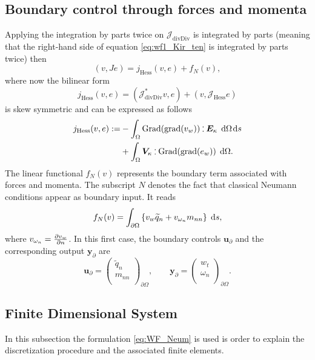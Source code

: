 \documentclass[letterpaper, 10 pt, conference]{ieeeconf}
\def\onedot{$\mathsurround0pt\ldotp$}
\def\cddot{%
	\mathbin{\vcenter{\baselineskip.67ex
			\hbox{\onedot}\hbox{\onedot}}%
}}
\begin{document}
\subsection{Boundary control through forces and momenta}
\label{subsec:controlForces}
Applying the integration by parts twice on $\mathcal{J}_{\mathrm{divDiv}}$ is integrated by parts (meaning that 
the right-hand side of equation \eqref{eq:wf1_Kir_ten} is integrated by parts twice) then 
\begin{equation}
\label{eq:WF_Neum}
(v, Je) = j_{\mathrm{Hess}}(v, e) + f_{N}(v),
\end{equation}
where now the bilinear form 
\[j_{\mathrm{Hess}}(v, e) = (\mathcal{J}_{\mathrm{divDiv}}^* v, e) + (v, \mathcal{J}_{\mathrm{Hess}}e) \] 
is skew symmetric and can be expressed as follows
\begin{equation} \label{eq:j_allgrad}
\begin{aligned}
j_{\mathrm{Hess}}(v, e): =  &-  \displaystyle\int_{\Omega} \mathrm{Grad}(\mathrm{grad}(v_w))  \cddot \bm{E}_{\kappa} \, \d\Omega \d{s}\\
&+ \displaystyle\int_{\Omega} \bm{V}_{\kappa} \cddot \mathrm{Grad}(\mathrm{grad}(e_w)) \, \d\Omega. 
\end{aligned}
\end{equation}
The linear functional $f_{N}(v)$ represents the boundary term associated with forces and momenta. The subscript $N$ denotes the fact that classical Neumann conditions appear as boundary input. It reads
\begin{equation} \label{eq:Neum_funct}
f_{N}(v) =  \displaystyle\int_{\partial \Omega} \left\{ v_w \widetilde{q}_n +  v_{\omega_n} m_{nn} \right\}  \d{s},
\end{equation}
where $ v_{\omega_n}=\diffp{v_w}{n}$. In this first case,  the boundary controls $\bm{u}_\partial$ and the corresponding output $\bm{y}_\partial$ are 
\[\bm{u}_\partial = 
\begin{pmatrix}
\widetilde{q}_n \\
m_{nn} \\
\end{pmatrix}_{\partial \Omega}, \qquad
\bm{y}_\partial = 
\begin{pmatrix}
w_t \\
\omega_n \\
\end{pmatrix}_{\partial \Omega}.
\]

\subsection{Finite Dimensional System}
\label{subsec:finPHs}
In this subsection the formulation \eqref{eq:WF_Neum} is used is order to explain the discretization procedure and the associated finite elements. 
\end{document}
